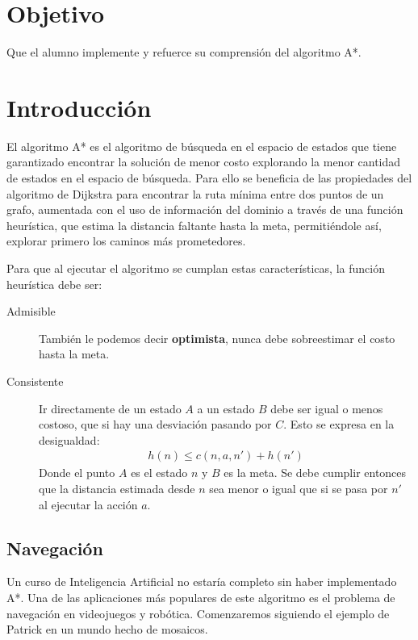 
\section{Objetivo}

Que el alumno implemente y refuerce su comprensión del algoritmo A*.

\section{Introducci\'on}

El algoritmo A* es el algoritmo de búsqueda en el espacio de estados que tiene garantizado encontrar la solución de menor costo explorando la menor cantidad de estados en el espacio de búsqueda.  Para ello se beneficia de las propiedades del algoritmo de Dijkstra para encontrar la ruta mínima entre dos puntos de un grafo, aumentada con el uso de información del dominio a través de una función heurística, que estima la distancia faltante hasta la meta, permitiéndole así, explorar primero los caminos más prometedores.

Para que al ejecutar el algoritmo se cumplan estas características, la función heurística debe ser:
\begin{description}
 \item [Admisible] También le podemos decir \textbf{optimista}, nunca debe sobreestimar el costo hasta la meta.

 \item [Consistente] Ir directamente de un estado $A$ a un estado $B$ debe ser igual o menos costoso, que si hay una desviación pasando por $C$.  Esto se expresa en la desigualdad:
 \begin{align*}
  h(n) \leq c(n,a,n') + h (n')
 \end{align*}
 Donde el punto $A$ es el estado $n$ y $B$ es la meta.  Se debe cumplir entonces que la distancia estimada desde $n$ sea menor o igual que si se pasa por $n'$ al ejecutar la acción $a$.
\end{description}



\subsection{Navegación}

Un curso de Inteligencia Artificial no estaría completo sin haber implementado A*.  Una de las aplicaciones más populares de este algoritmo es el problema de navegación en videojuegos y robótica.  Comenzaremos siguiendo el ejemplo de Patrick \cite{Lester2003} en un mundo hecho de mosaicos.

